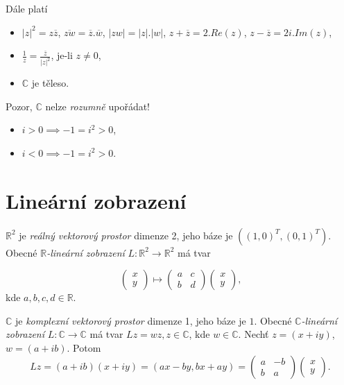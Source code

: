 Dále platí
\begin{itemize}
    \item $|z|^2 = z\overline{z}$, $\overline{zw} = \overline{z}.\overline{w}$, $|zw| = |z|.|w|$, $z+\overline{z} = 2.Re(z)$, $z-\overline{z} = 2i.Im(z)$,
    \item $\frac{1}{z} = \frac{\overline{z}}{|z|^2}$, je-li $z\neq 0$,
    \item $\mathbb{C}$ je těleso.
\end{itemize}

Pozor, $\mathbb{C}$ nelze \emph{rozumně} upořádat!
\begin{itemize}
    \item $i>0\implies -1=i^2>0$,
    \item $i<0\implies -1=i^2>0$.
\end{itemize}


\section{Lineární zobrazení}
\begin{definition}
$\mathbb{R}^2$ je \emph{reálný vektorový prostor} dimenze 2, jeho báze je $\left((1,0)^T, (0,1)^T\right)$. Obecné $\mathbb{R}$\emph{-lineární zobrazení} $L:\mathbb{R}^2\to\mathbb{R}^2$ má tvar 

\begin{equation}\label{eq:rLinearMap}
\begin{pmatrix}
x \\ y
\end{pmatrix}
\longmapsto
\begin{pmatrix}
a & c\\
b & d
\end{pmatrix}
\begin{pmatrix}
x \\ y
\end{pmatrix}
\text{,}
\end{equation}
kde $a,b,c,d\in\mathbb{R}$.

$\mathbb{C}$ je \emph{komplexní vektorový prostor} dimenze 1, jeho báze je $1$. Obecné $\mathbb{C}$\emph{-lineární zobrazení} $L:\mathbb{C}\to\mathbb{C}$ má tvar $Lz = wz, z\in\mathbb{C}$, kde $w\in\mathbb{C}$. Nechť $z = (x+iy)$, $ w=(a+ib)$. 
Potom $$Lz=(a+ib)(x+iy)= (ax-by, bx+ay) = 
\begin{pmatrix}
a & -b\\
b & a
\end{pmatrix}
\begin{pmatrix}
x \\ y
\end{pmatrix}\text{.}$$
\end{definition}

